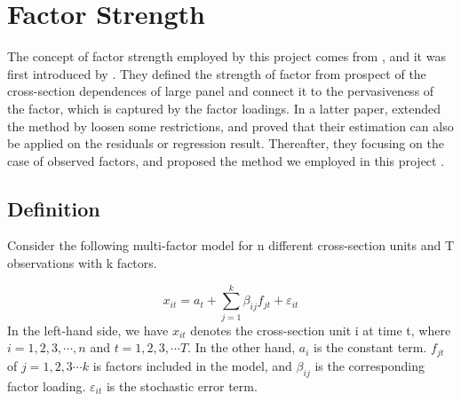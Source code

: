 \documentclass[12pt]{article}
\begin{document}
\section{Factor Strength}\label{strength}
The concept of factor strength employed by this project comes from , and it was first introduced by .
They defined the strength of factor from prospect of the cross-section dependences of large panel and connect it to the pervasiveness of the factor, which is captured by the factor loadings.
In a latter paper,  extended the method by loosen some restrictions, and proved that their estimation can also be applied on the residuals or regression result.
Thereafter, they focusing on the case of observed factors, and proposed the method we employed in this project \cite{Bailey2020}.

		\subsection{Definition}\label{definiton}

Consider the following multi-factor model for n different cross-section units and T observations with k  factors.

\[  x_{it} = a_{t}+  \sum_{j=1}^{k}\beta_{ij}f_{jt} + \varepsilon_{it} \tag{1}\label{definition_model} \]
In the left-hand side, we have $x_{it}$ denotes the cross-section unit i at time t, where $i = 1, 2,3, \cdots, n$ and $t = 1,2,3, \cdots T$.  
In the other hand, $a_{i}$ is the constant term.
$f_{jt}$ of $j = 1, 2, 3\cdots k$ is factors included in the model, and $\beta_{ij}$ is the corresponding factor loading.
$\varepsilon_{it}$ is the stochastic error term.
\end{document}
